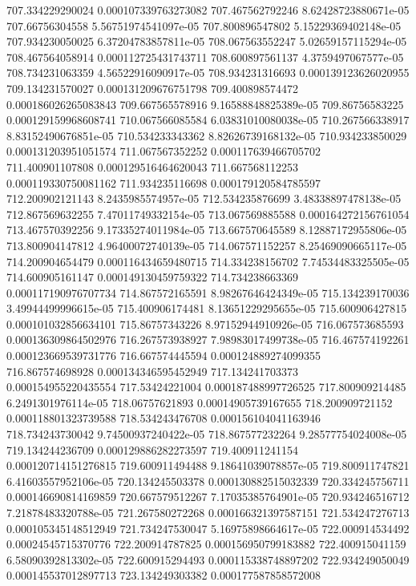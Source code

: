 {707.334229290024 0.000107339763273082
707.467562792246 8.62428723880671e-05
707.66756304558 5.56751974541097e-05
707.800896547802 5.15229369402148e-05
707.934230050025 6.37204783857811e-05
708.067563552247 5.02659157115294e-05
708.467564058914 0.000112725431743711
708.600897561137 4.3759497067577e-05
708.734231063359 4.56522916090917e-05
708.934231316693 0.000139123626020955
709.134231570027 0.000131209676751798
709.400898574472 0.000186026265083843
709.667565578916 9.16588848825389e-05
709.86756583225 0.000129159968608741
710.067566085584 6.03831010080038e-05
710.267566338917 8.83152490676851e-05
710.534233343362 8.82626739168132e-05
710.934233850029 0.000131203951051574
711.067567352252 0.000117639466705702
711.400901107808 0.000129516464620043
711.667568112253 0.000119330750081162
711.934235116698 0.000179120584785597
712.200902121143 8.2435985574957e-05
712.534235876699 3.48338897478138e-05
712.867569632255 7.47011749332154e-05
713.067569885588 0.000164272156761054
713.467570392256 9.17335274011984e-05
713.667570645589 8.12887172955806e-05
713.800904147812 4.96400072740139e-05
714.067571152257 8.25469090665117e-05
714.200904654479 0.000116434659480715
714.334238156702 7.74534483325505e-05
714.600905161147 0.000149130459759322
714.734238663369 0.000117190976707734
714.867572165591 8.98267646424349e-05
715.134239170036 3.49944499996615e-05
715.400906174481 8.13651229295655e-05
715.600906427815 0.000101032856634101
715.86757343226 8.97152944910926e-05
716.067573685593 0.000136309864502976
716.267573938927 7.98983017499738e-05
716.467574192261 0.000123669539731776
716.667574445594 0.000124889274099355
716.867574698928 0.000134346595452949
717.134241703373 0.000154955220435554
717.53424221004 0.000187488997726525
717.800909214485 6.2491301976114e-05
718.06757621893 0.00014905739167655
718.200909721152 0.000118801323739588
718.534243476708 0.000156104041163946
718.734243730042 9.74500937240422e-05
718.867577232264 9.28577754024008e-05
719.134244236709 0.000129886282273597
719.400911241154 0.000120714151276815
719.600911494488 9.18641039078857e-05
719.800911747821 6.41603557952106e-05
720.134245503378 0.000130882515032339
720.334245756711 0.000146690814169859
720.667579512267 7.17035385764901e-05
720.934246516712 7.21878483320788e-05
721.267580272268 0.000166321397587151
721.534247276713 0.000105345148512949
721.734247530047 5.16975898664617e-05
722.000914534492 0.00024545715370776
722.200914787825 0.000156950799183882
722.400915041159 6.58090392813302e-05
722.600915294493 0.000115338748897202
722.934249050049 0.000145537012897713
723.134249303382 0.000177587858572008
}
